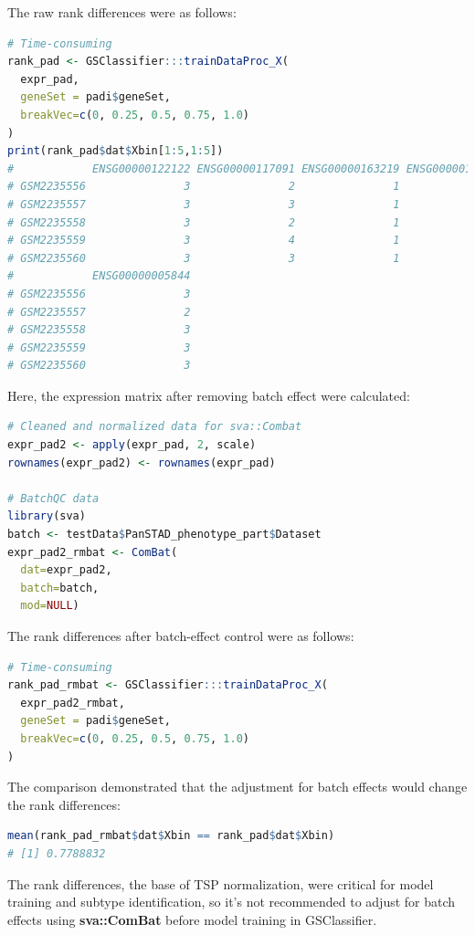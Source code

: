 \documentclass[
  12pt,
]{book}
\begin{document}
The raw rank differences were as follows:

\begin{lstlisting}[language=R]
# Time-consuming
rank_pad <- GSClassifier:::trainDataProc_X(
  expr_pad, 
  geneSet = padi$geneSet,
  breakVec=c(0, 0.25, 0.5, 0.75, 1.0)
)
print(rank_pad$dat$Xbin[1:5,1:5])
#            ENSG00000122122 ENSG00000117091 ENSG00000163219 ENSG00000136167
# GSM2235556               3               2               1               4
# GSM2235557               3               3               1               4
# GSM2235558               3               2               1               4
# GSM2235559               3               4               1               4
# GSM2235560               3               3               1               4
#            ENSG00000005844
# GSM2235556               3
# GSM2235557               2
# GSM2235558               3
# GSM2235559               3
# GSM2235560               3
\end{lstlisting}

Here, the expression matrix after removing batch effect were calculated:

\begin{lstlisting}[language=R]
# Cleaned and normalized data for sva::Combat
expr_pad2 <- apply(expr_pad, 2, scale)
rownames(expr_pad2) <- rownames(expr_pad)

# BatchQC data
library(sva)
batch <- testData$PanSTAD_phenotype_part$Dataset
expr_pad2_rmbat <- ComBat(
  dat=expr_pad2,
  batch=batch, 
  mod=NULL)
\end{lstlisting}

The rank differences after batch-effect control were as follows:

\begin{lstlisting}[language=R]
# Time-consuming
rank_pad_rmbat <- GSClassifier:::trainDataProc_X(
  expr_pad2_rmbat, 
  geneSet = padi$geneSet,
  breakVec=c(0, 0.25, 0.5, 0.75, 1.0)
)
\end{lstlisting}

The comparison demonstrated that the adjustment for batch effects would change the rank differences:

\begin{lstlisting}[language=R]
mean(rank_pad_rmbat$dat$Xbin == rank_pad$dat$Xbin)
# [1] 0.7788832
\end{lstlisting}

The rank differences, the base of TSP normalization, were critical for model training and subtype identification, so it's not recommended to adjust for batch effects using \textbf{sva::ComBat} before model training in GSClassifier.
\end{document}
